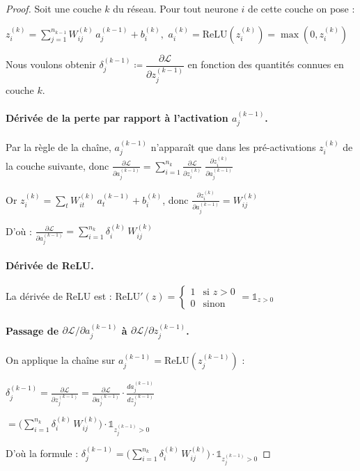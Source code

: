\documentclass[12pt,a4paper]{report}
\numberwithin{equation}{section}
\begin{document}
\begin{proof}
Soit une couche $k$ du réseau. Pour tout neurone $i$ de cette couche on pose :

$z^{(k)}_i = \sum_{j=1}^{n_{k-1}} W^{(k)}_{ij}\, a^{(k-1)}_j + b^{(k)}_i,$
$a^{(k)}_i = \text{ReLU}(z^{(k)}_i) = \max(0, z^{(k)}_i)$

Nous voulons obtenir $\delta^{(k-1)}_j \coloneqq \dfrac{\partial \mathcal{L}}{\partial z^{(k-1)}_j}$ en fonction des quantités connues en couche $k$.

\paragraph{Dérivée de la perte par rapport à l'activation $a^{(k-1)}_j$.}

Par la règle de la chaîne, $a^{(k-1)}_j$ n'apparaît que dans les pré-activations $z^{(k)}_i$ de la couche suivante, donc
$\frac{\partial \mathcal{L}}{\partial a^{(k-1)}_j} = \sum_{i=1}^{n_k} \frac{\partial \mathcal{L}}{\partial z^{(k)}_i}\; \frac{\partial z^{(k)}_i}{\partial a^{(k-1)}_j}$

Or $z^{(k)}_i = \sum_{t} W^{(k)}_{it}\, a^{(k-1)}_t + b^{(k)}_i$, donc
$\frac{\partial z^{(k)}_i}{\partial a^{(k-1)}_j} = W^{(k)}_{ij}$

D'où :
$\frac{\partial \mathcal{L}}{\partial a^{(k-1)}_j} = \sum_{i=1}^{n_k} \delta^{(k)}_i \, W^{(k)}_{ij}$

\paragraph{Dérivée de ReLU.}
La dérivée de ReLU est :
$\text{ReLU}'(z) = \begin{cases} 1 & \text{si } z > 0\\ 0 & \text{sinon} \end{cases} = \mathbb{1}_{z > 0}$

\paragraph{Passage de $\partial\mathcal{L}/\partial a^{(k-1)}_j$ à $\partial\mathcal{L}/\partial z^{(k-1)}_j$.}
On applique la chaîne sur $a^{(k-1)}_j = \text{ReLU}(z^{(k-1)}_j)$ :

$\delta^{(k-1)}_j = \frac{\partial \mathcal{L}}{\partial z^{(k-1)}_j} = \frac{\partial \mathcal{L}}{\partial a^{(k-1)}_j} \cdot \frac{da^{(k-1)}_j}{dz^{(k-1)}_j}$

$= \Big(\sum_{i=1}^{n_k} \delta^{(k)}_i \, W^{(k)}_{ij}\Big) \cdot \mathbb{1}_{z^{(k-1)}_j > 0}$

D'où la formule :
$\boxed{\delta^{(k-1)}_j = \Big(\sum_{i=1}^{n_k} \delta^{(k)}_i \, W^{(k)}_{ij}\Big) \cdot \mathbb{1}_{z^{(k-1)}_j > 0}}$
\end{proof}
\end{document}
